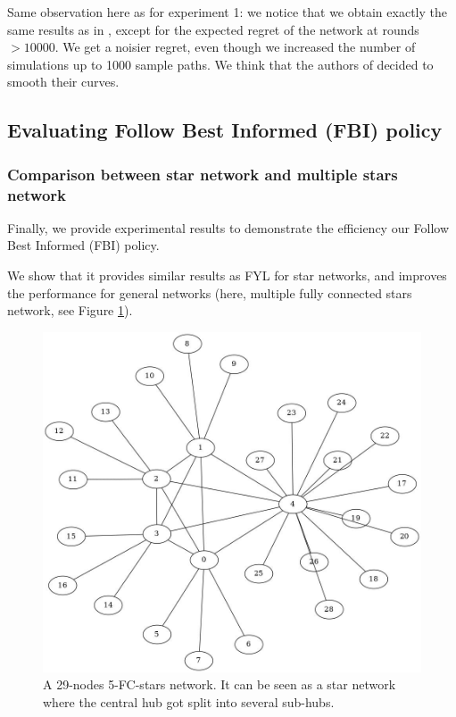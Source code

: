 \documentclass{article}
\begin{document}
Same observation here as for experiment 1: we notice that we obtain exactly the same results as in \cite{DBLP:journals/corr/KollaJG16}, except for the expected regret of the network at rounds $ > 10000$. We get a noisier regret, even though we increased the number of simulations up to 1000 sample paths. We think that the authors of \cite{DBLP:journals/corr/KollaJG16} decided to smooth their curves.

\subsection{Evaluating Follow Best Informed (FBI) policy}
\label{FBI}

\subsubsection{Comparison between star network and multiple stars network}

Finally, we provide experimental results to demonstrate the efficiency our Follow Best Informed (FBI) policy.

We show that it provides similar results as FYL for star networks, and improves the performance for general networks (here, multiple fully connected stars network, see Figure \ref{fcstars}).

\begin{figure}[H]
  \centering
  \includegraphics[width=0.6\linewidth]{fcstars.jpg}
  \caption{A 29-nodes 5-FC-stars network. It can be seen as a star network where the central hub got split into several sub-hubs.}
  \label{fcstars}
\end{figure}
\end{document}
